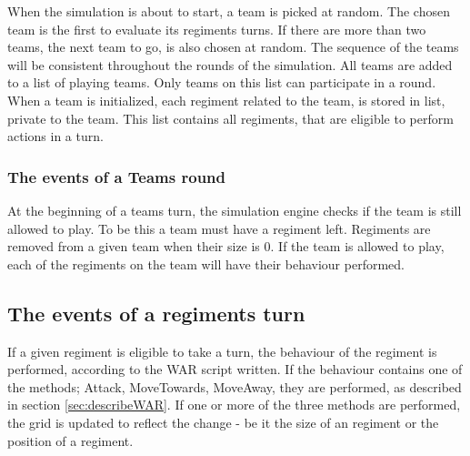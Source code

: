 When the simulation is about to start, a team is picked at random. The chosen team is the first to evaluate its regiments turns. If there are more than two teams, the next team to go, is also chosen at random. The sequence of the teams will be consistent throughout the rounds of the simulation. All teams are added to a list of playing teams. Only teams on this list can participate in a round. When a team is initialized, each regiment related to the team, is stored in list, private to the team. This list contains all regiments, that are eligible to perform actions in a turn. 

		\subsubsection{The events of a Teams round}
		At the beginning of a teams turn, the simulation engine checks if the team is still allowed to play. 
		To be this a team must have a regiment left. Regiments are removed from a given team when their size is 0.
		If the team is allowed to play, each of the regiments on the team will have their behaviour performed.
		

		\subsection{The events of a regiments turn}
		If a given regiment is eligible to take a turn, the behaviour of the regiment is performed, 
		according to the WAR script written. If the behaviour contains one of the methods; 
		Attack, MoveTowards, MoveAway, they are performed, as described in section \ref{sec:describeWAR}. 
		If one or more of the three methods are performed, the grid is updated to reflect the change - 
		be it the size of an regiment or the position of a regiment. 